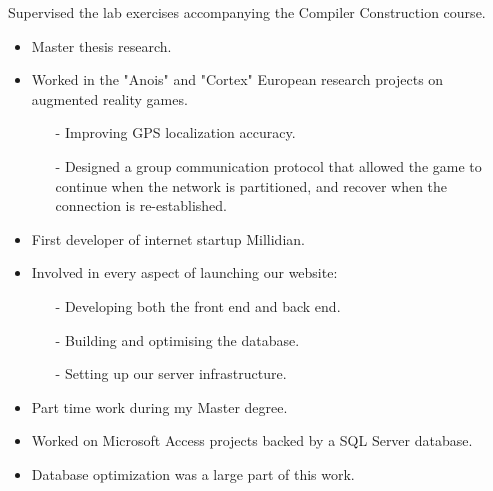 \documentclass[10pt,a4paper]{../altacv}
\begin{document}
\medskip

Supervised the lab exercises accompanying the Compiler Construction course.

\medskip



\newpage
\medskip\medskip{}

\begin{itemize}
\item Master thesis research.
\item Worked in the "Anois" and "Cortex" European research projects on augmented reality games.
	\begin{itemize}
	\item[-] Improving GPS localization accuracy.
	\item[-] Designed a group communication protocol that allowed the game to continue when the network is partitioned, and recover when the connection is re-established.
	\end{itemize}
\end{itemize}





\medskip\medskip{}

\begin{itemize}
\item First developer of internet startup Millidian.
\item Involved in every aspect of launching our website:
	\begin{itemize}
	\item[-] Developing both the front end and back end.
	\item[-] Building and optimising the database.
	\item[-] Setting up our server infrastructure.
	\end{itemize}
\end{itemize}




\medskip\medskip{}

\begin{itemize}
	\item Part time work during my Master degree.
	\item Worked on Microsoft Access projects backed by a SQL Server database.
	\item Database optimization was a large part of this work.
\end{itemize}
\end{document}
